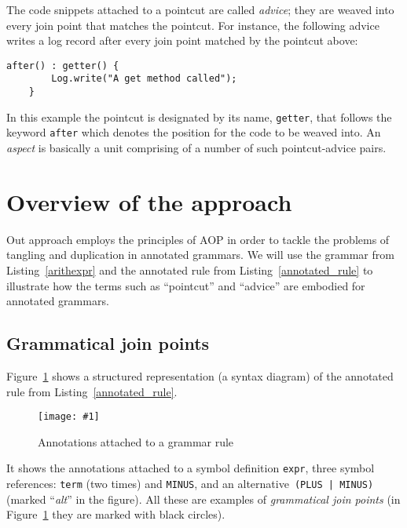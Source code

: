 \documentclass{IOS-Book-Article}     %
\newcommand{\fig}[2]{%
\begin{figure}%
\centering%
\texttt{[image: \#1]}%
\caption{#2}\label{#1}%
\end{figure}%
}
\newcommand{\lstref}[1]{Listing~\ref{#1}}
\newcommand{\figref}[1]{Figure~\ref{#1}}
\begin{document}
The code snippets attached to a pointcut are called \emph{advice}; they are weaved into every join point that matches the pointcut. For instance, the following advice writes a log record after every join point matched by the pointcut above:
\begin{lstlisting}[language={[AspectJ]Java}]
    after() : getter() {
        Log.write("A get method called");
    }
\end{lstlisting}
In this example the pointcut is designated by its name, \texttt{getter}, that follows the keyword \texttt{after} which denotes the position for the code to be weaved into.
An \emph{aspect} is basically a unit comprising of a number of such pointcut-advice pairs.

\section{Overview of the approach}\label{Approach}

Out approach employs the principles of AOP in order to tackle the problems of tangling and duplication in annotated grammars. We will use the grammar from \lstref{arithexpr} and the annotated rule from \lstref{annotated_rule} to illustrate how the terms such as ``pointcut'' and ``advice'' are embodied for annotated grammars. 

\subsection{Grammatical join points}
\figref{structured} shows a structured representation (a syntax diagram) of the annotated rule from \lstref{annotated_rule}. 
\fig{structured}{Annotations attached to a grammar rule}
It shows the annotations attached to a symbol definition \texttt{expr}, three symbol references: \texttt{term} (two times) and \texttt{MINUS}, and an alternative~\mbox{\texttt{(PLUS | MINUS)}} (marked ``\emph{alt}'' in the figure). All these are examples of \emph{grammatical join points} (in \figref{structured} they are marked with black circles). 
\end{document}
